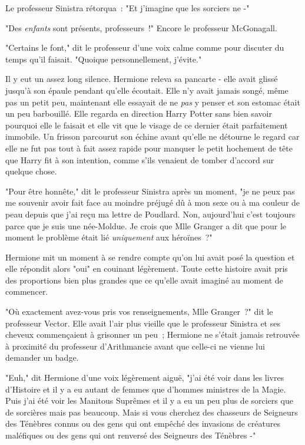 Le professeur Sinistra rétorqua~: "Et j'imagine que les sorciers ne -"

"Des \emph{enfants} sont présents, professeurs~!" Encore le professeur McGonagall.

"Certains le font," dit le professeur d'une voix calme comme pour discuter du temps qu'il faisait. "Quoique personnellement, j'évite."

Il y eut un assez long silence. Hermione releva sa pancarte - elle avait glissé jusqu'à son épaule pendant qu'elle écoutait. Elle n'y avait jamais songé, même pas un petit peu, maintenant elle essayait de ne \emph{pas} y penser et son estomac était un peu barbouillé. Elle regarda en direction Harry Potter sans bien savoir pourquoi elle le faisait et elle vit que le visage de ce dernier était parfaitement immobile. Un frisson parcourut son échine avant qu'elle ne détourne le regard car elle ne fut pas tout à fait assez rapide pour manquer le petit hochement de tête que Harry fit à son intention, comme s'ils venaient de tomber d'accord sur quelque chose.

"Pour être honnête," dit le professeur Sinistra après un moment, "je ne peux pas me souvenir avoir fait face au moindre préjugé dû à mon sexe ou à ma couleur de peau depuis que j'ai reçu ma lettre de Poudlard. Non, aujourd'hui c'est toujours parce que je suis une née-Moldue. Je crois que Mlle Granger a dit que pour le moment le problème était lié \emph{uniquement} aux héroïnes~?"

Hermione mit un moment à se rendre compte qu'on lui avait posé la question et elle répondit alors "oui" en couinant légèrement. Toute cette histoire avait pris des proportions bien plus grandes que ce qu'elle avait imaginé au moment de commencer.

"Où exactement avez-vous pris vos renseignements, Mlle Granger~?" dit le professeur Vector. Elle avait l'air plus vieille que le professeur Sinistra et ses cheveux commençaient à grisonner un peu~; Hermione ne s'était jamais retrouvée à proximité du professeur d'Arithmancie avant que celle-ci ne vienne lui demander un badge.

"Euh," dit Hermione d'une voix légèrement aiguë, "j'ai été voir dans les livres d'Histoire et il y a eu autant de femmes que d'hommes ministres de la Magie. Puis j'ai été voir les Manitous Suprêmes et il y a eu un peu plus de sorciers que de sorcières mais pas beaucoup. Mais si vous cherchez des chasseurs de Seigneurs des Ténèbres connus ou des gens qui ont empêché des invasions de créatures maléfiques ou des gens qui ont renversé des Seigneurs des Ténèbres -"

